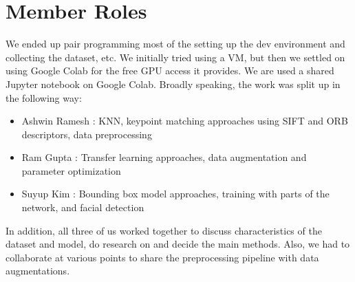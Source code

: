 \section{Member Roles}
We ended up pair programming most of the setting up the dev environment and collecting the dataset, etc. We initially tried using a VM, but then we settled on using Google Colab for the free GPU access it provides. We are used a shared Jupyter notebook on Google Colab. Broadly speaking, the work was split up in the following way: 
\begin{itemize}
    \item Ashwin Ramesh : KNN, keypoint matching approaches using SIFT and ORB descriptors, data preprocessing
    \item Ram Gupta : Transfer learning approaches, data augmentation and parameter optimization
    \item Suyup Kim : Bounding box model approaches, training with parts of the network, and facial detection
\end{itemize}

In addition, all three of us worked together to discuss characteristics of the dataset and model, do research on and decide the main methods. Also, we had to collaborate at various points to share the preprocessing pipeline with data augmentations.